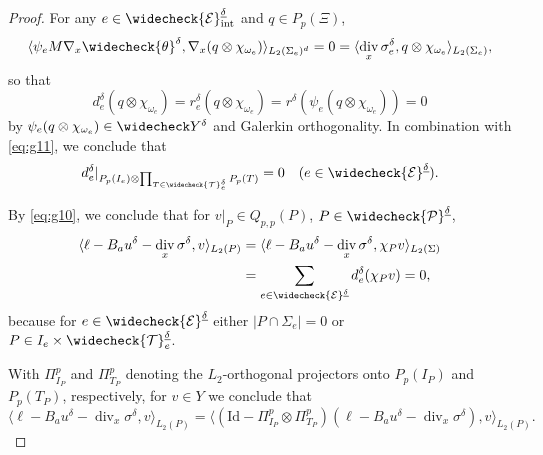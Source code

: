 \documentclass{amsart}
\numberwithin{equation}{section}
\newcommand{\cE}{\mathcal E}
\newcommand{\identity}{\mathrm{Id}}
\newcommand{\1}{\mathbb 1}
\DeclareMathOperator{\divv}{div}
\newcommand{\tria}{{\mathcal T}}
\newcommand{\pria}{{\mathcal P}}
\begin{document}
\begin{proof}
For any $e \in \widecheck{\cE}_{\rm int}^{\underline{\delta}}$ and $q \in P_p(\Xi)$,
$$
\langle \psi_e M \nabla_x \widecheck{\theta}^\delta, \nabla_x (q \otimes \chi_{\omega_e}) \rangle_{L_2(\Sigma_e)^d}=0=\langle \divv_x \sigma_{e}^\delta,q \otimes \chi_{\omega_e}\rangle_{L_2(\Sigma_e)},
$$
so that
$$
d_e^\delta(q \otimes \chi_{\omega_e})=r_e^\delta(q \otimes \chi_{\omega_e})=r^\delta(\psi_e (q \otimes \chi_{\omega_e}))=0
$$
by $\psi_e (q \otimes \chi_{\omega_e})\in \widecheck Y^\delta$ and Galerkin orthogonality. In combination with \eqref{eq:g11}, we conclude that
$$
d_e^\delta|_{P_p(I_e) \otimes \prod_{T \in \widecheck\tria_e^\delta} P_{p}(T)}=0 \quad(e \in \widecheck{\cE}^{\underline{\delta}}).
$$

By \eqref{eq:g10}, we conclude that for $v|_P \in Q_{p,p}(P)$, $P\in\widecheck\pria^{\underline\delta}$,
\begin{align*}
\langle \ell-B_a u^\delta-\divv_x \sigma^\delta,v\rangle_{L_2(P)}&=
\langle \ell-B_a u^\delta-\divv_x \sigma^\delta,\chi_P v\rangle_{L_2(\Sigma)}\\
&=\sum_{e \in \widecheck{\cE}^{\underline{\delta}}} d_e^\delta( \chi_P v)=0,
\end{align*}
because for $e \in \widecheck{\cE}^{\underline{\delta}}$ either $|P\cap \Sigma_e|=0$ or $P \in I_e  \times \widecheck\tria_e^{\underline{\delta}}$. 

With $\Pi_{I_P}^p$ 
and $\Pi^{p}_{T_P}$ denoting the $L_2$-orthogonal projectors onto $P_p(I_P)$ and $P_{p}(T_P)$, respectively, for $v \in Y$ we conclude that
$$
\langle \ell-B_a u^\delta-\divv_x \sigma^\delta,v\rangle_{L_2(P)}=
\langle (\identity-\Pi_{I_P}^p \otimes \Pi^{p}_{T_P})(\ell-B_a u^\delta-\divv_x \sigma^\delta),v\rangle_{L_2(P)}.
$$


\end{proof}
\end{document}
